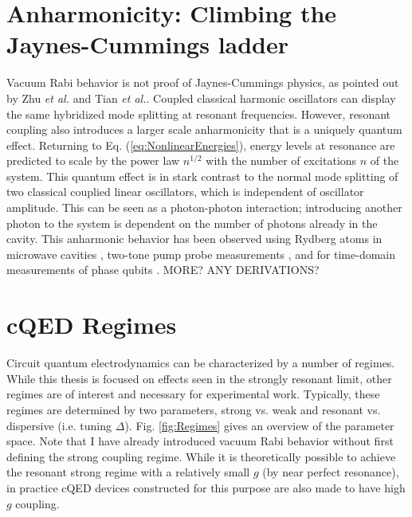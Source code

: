 \documentclass[11 pt, oneside]{book} %
\begin{document}
\section{Anharmonicity: Climbing the Jaynes-Cummings ladder}\label{sec:Anharmonicity}
Vacuum Rabi behavior is not proof of Jaynes-Cummings physics, as pointed out by Zhu \emph{et al.}\cite{Zhu} and Tian \emph{et al.}\cite{Tian}. Coupled classical harmonic oscillators can display the same hybridized mode splitting at resonant frequencies. However, resonant coupling also introduces a larger scale anharmonicity that is a uniquely quantum effect. Returning to  Eq. (\ref{eq:NonlinearEnergies}), energy levels at resonance are predicted to scale by the power law $n^{1/2}$ with the number of excitations $n$ of the system. This quantum effect is in stark contrast to the normal mode splitting of two classical couplied linear oscillators, which is independent of oscillator amplitude\cite{Fink}. This can be seen as a photon-photon interaction; introducing another photon to the system is dependent on the number of photons already in the cavity. This anharmonic behavior has been observed using Rydberg atoms in microwave cavities \cite{}, two-tone pump probe measurements \cite{Fink}, and for time-domain measurements of phase qubits \cite{Hofheinz, Wang}.
MORE? ANY DERIVATIONS?

\section{cQED Regimes} %
Circuit quantum electrodynamics can be characterized by a number of regimes. While this thesis is focused on effects seen in the strongly resonant limit, other regimes are of interest and necessary for experimental work. Typically, these regimes are determined by two parameters, strong vs. weak and resonant vs. dispersive (i.e. tuning $\Delta$). Fig. \ref{fig:Regimes} gives an overview of the parameter space. Note that I have already introduced vacuum Rabi behavior without first defining the strong coupling regime. While it is theoretically possible to achieve the resonant strong regime with a relatively small $g$ (by near perfect resonance), in practice cQED devices constructed for this purpose are also made to have high $g$ coupling. 
\end{document}
